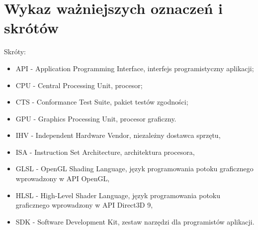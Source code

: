 \chapter*{Wykaz ważniejszych oznaczeń i skrótów}

Skróty:
\begin{itemize}
\item{API} - Application Programming Interface, interfejs programistyczny aplikacji;
\item{CPU} - Central Processing Unit, procesor;
\item{CTS} - Conformance Test Suite, pakiet testów zgodności;
\item{GPU} - Graphics Processing Unit, procesor graficzny.
\item{IHV} - Independent Hardware Vendor, niezależny dostawca sprzętu,
\item{ISA} - Instruction Set Architecture, architektura procesora,
\item{GLSL} - OpenGL Shading Language, język programowania potoku graficznego wprowadzony w API OpenGL,
\item{HLSL} - High-Level Shader Language, język programowania potoku graficznego wprowadzony w API Direct3D 9,
\item{SDK} - Software Development Kit, zestaw narzędzi dla programistów aplikacji.
\end{itemize}